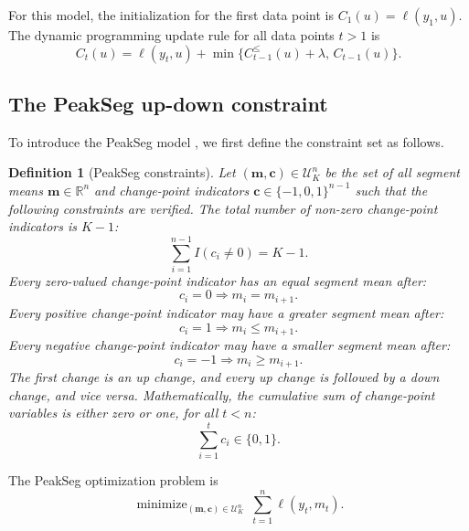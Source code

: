\documentclass{article}
\newtheorem{definition}{Definition}
\DeclareMathOperator*{\minimize}{minimize}
\newcommand{\RR}{\mathbb R}
\begin{document}
For this model, the initialization for the first data point is
$C_1(u) = \ell(y_1, u)$. The dynamic programming update rule for all data points $t>1$ is
\begin{equation}
  C_t(u) = \ell(y_t, u) + \min\{
  C_{t-1}^\leq(u) + \lambda,\, C_{t-1}(u)
  \}.
\end{equation}

\subsection{The PeakSeg up-down constraint}

To introduce the PeakSeg model \citep{HOCKING-PeakSeg}, we first
define the constraint set as follows.
\begin{definition}[PeakSeg constraints]
  \label{def:U}
  Let $(\mathbf m, \mathbf c)\in\mathcal U_K^n$ be the set of all segment means
  $\mathbf m\in\RR^n$ and change-point indicators
  $\mathbf c\in\{-1, 0,1\}^{n-1}$ such that the following constraints are
  verified. The total number of non-zero change-point indicators is $K-1$:
  \begin{equation}
    \label{eq:U_segments}
    \sum_{i=1}^{n-1} I(c_i \neq 0) = K-1.
  \end{equation}
  Every zero-valued change-point indicator has an equal segment mean
  after:
  \begin{equation}
    \label{eq:U_0}
    c_i = 0 \Rightarrow m_i = m_{i+1}.
  \end{equation}
  Every positive change-point indicator may have a greater segment
  mean after:
  \begin{equation}
    \label{eq:U_1}
    c_i = 1 \Rightarrow m_i \leq m_{i+1}.
  \end{equation}
  Every negative change-point indicator may have a smaller segment
  mean after:
  \begin{equation}
    \label{eq:U-1}
    c_i = -1 \Rightarrow m_i \geq m_{i+1}.
  \end{equation}
  The first change is an up change, and every up change is followed by a
  down change, and vice versa. Mathematically, the cumulative sum of
  change-point variables is either zero or one, for all $t<n$:
  \begin{equation}
    \label{eq:U-cum}
    \sum_{i=1}^t c_i \in \{0, 1\}.
  \end{equation}
\end{definition}
The PeakSeg optimization problem is
\begin{equation}
    \minimize_{
        (\mathbf m, \mathbf c)\in\mathcal U^n_K
      } \ 
\sum_{t=1}^n \ell(y_t, m_t).
\end{equation}
\end{document}
